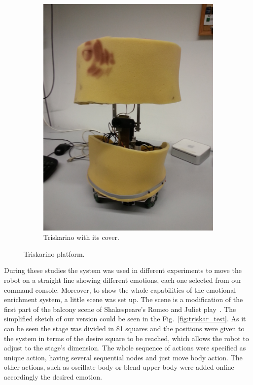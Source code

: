 \begin{figure}
\begin{subfigure}[c]{0.2\textwidth}
	\includegraphics[width=\textwidth]{./Images/platform_fome.jpg}
	\caption{Triskarino with its cover.}
	\label{fig:triskar}
	\end{subfigure}
	\caption{Triskarino platform.}
	\label{fig:robot}
\end{figure}  
 During these studies the system was used in different experiments to move the robot on a straight line showing different emotions, each one selected from our command console. Moreover, to show the whole capabilities of the emotional enrichment system, a little scene was set up. The scene is a modification of the first part of the balcony scene of Shakespeare's Romeo and Juliet play~\cite{RAndJ}. The simplified sketch of our version could be seen in the Fig.~\ref{fig:triskar_test}. As it can be seen the stage was divided in 81 squares and the positions were given to the system in terms of the desire square to be reached, which allows the robot to adjust to the stage's dimension.
The whole sequence of actions were specified as unique action, having several sequential nodes and just move body action. The other actions, such as oscillate body or blend upper body were added online accordingly the desired emotion.  

